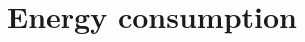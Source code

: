 \documentclass[a4paper,10pt]{report}
\begin{document}
\section{\textbf{Energy consumption}}
\end{document}
